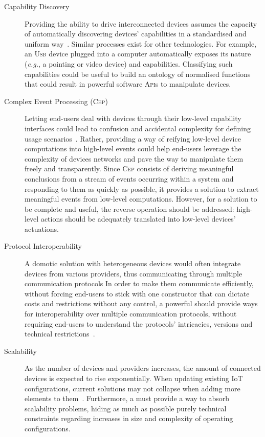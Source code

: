 \begin{description}
	\item[Capability Discovery] Providing the ability to drive interconnected devices assumes the capacity of automatically discovering devices' capabilities in a standardised and uniform way~\cite{chaqfeh-12}. Similar processes exist for other technologies. For example, an \textsc{Usb} device plugged into a computer automatically exposes its nature (\textit{e.g.}, a pointing or video device) and capabilities. Classifying such capabilities could be useful to build an ontology of normalised functions that could result in powerful software \textsc{Api}s to manipulate devices. 
		
	\item[Complex Event Processing (\textsc{Cep})] Letting end-users deal with devices through their low-level capability interfaces could lead to confusion and accidental complexity for defining usage scenarios~\cite{ma-13}. Rather, providing a way of reifying low-level device computations into high-level events could help end-users leverage the complexity of devices networks and pave the way to manipulate them freely and transparently. Since \textsc{Cep} consists of deriving meaningful conclusions from a stream of events occurring within a system and responding to them as quickly as possible, it provides a solution to extract meaningful events from low-level computations. However, for a solution to be complete and useful, the reverse operation should be addressed: high-level actions should be adequately translated into low-level devices' actuations. 
		
	\item[Protocol Interoperability] A domotic solution with heterogeneous devices would often integrate devices from various providers, thus communicating through multiple communication protocols In order to make them communicate efficiently, without forcing end-users to stick with one constructor that can dictate costs and restrictions without any control, a powerful \DSL should provide ways for interoperability over multiple communication protocols, without requiring end-users to understand the protocols' intricacies, versions and technical restrictions~\cite{gubbi-13}.
	
	\item[Scalability] As the number of devices and providers increases, the amount of connected devices is expected to rise exponentially. When updating existing IoT configurations, current solutions may not collapse when adding more elements to them~\cite{mukho-14}. Furthermore, a \DSL must provide a way to absorb scalability problems, hiding as much as possible purely technical constraints regarding increases in size and complexity of operating configurations. 
	

\end{description}
